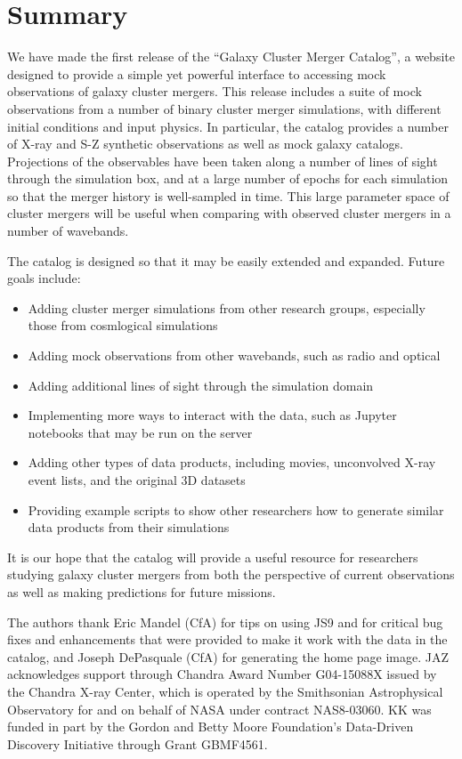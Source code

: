 \documentclass{emulateapj}
\begin{document}
\section{Summary}\label{sec:summary}

We have made the first release of the ``Galaxy Cluster Merger Catalog'', a website designed to provide a simple yet powerful interface to accessing mock observations of galaxy cluster mergers. This release includes a suite of mock observations from a number of binary cluster merger simulations, with different initial conditions and input physics. In particular, the catalog provides a number of X-ray and S-Z synthetic observations as well as mock galaxy catalogs. Projections of the observables have been taken along a number of lines of sight through the simulation box, and at a large number of epochs for each simulation so that the merger history is well-sampled in time. This large parameter space of cluster mergers will be useful when comparing with observed cluster mergers in a number of wavebands.

The catalog is designed so that it may be easily extended and expanded. Future goals include:

\begin{itemize}
\item Adding cluster merger simulations from other research groups, especially those from cosmlogical simulations
\item Adding mock observations from other wavebands, such as radio and optical
\item Adding additional lines of sight through the simulation domain
\item Implementing more ways to interact with the data, such as Jupyter notebooks that may be run on the server
\item Adding other types of data products, including movies, unconvolved X-ray event lists, and the original 3D datasets
\item Providing example scripts to show other researchers how to generate similar data products from their simulations
\end{itemize}

It is our hope that the catalog will provide a useful resource for researchers studying galaxy cluster mergers from both the perspective of current observations as well as making predictions for future missions.

\acknowledgements
The authors thank Eric Mandel (CfA) for tips on using JS9 and for critical bug fixes and enhancements that were provided to make it work with the data in the catalog, and Joseph DePasquale (CfA) for generating the home page image. JAZ acknowledges support through Chandra Award Number G04-15088X issued by the Chandra X-ray Center, which is operated by the Smithsonian Astrophysical Observatory for and on behalf of NASA under contract NAS8-03060. KK was funded in part by the Gordon and Betty Moore Foundation's Data-Driven Discovery Initiative through Grant GBMF4561.
\end{document}
